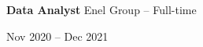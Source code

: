 \documentclass[10pt, letterpaper]{article}
\newenvironment{highlights}{
    \begin{itemize}[
        topsep=0.10 cm,
        parsep=0.10 cm,
        partopsep=0pt,
        itemsep=0pt,
        leftmargin=0 cm + 10pt
    ]
}{
    \end{itemize}
} %
\newenvironment{twocolentry}[2][]{
    \onecolentry
    \def\secondColumn{#2}
    \setcolumnwidth{\fill, 4.5 cm}
    \begin{paracol}{2}
}{
    \switchcolumn \raggedleft \secondColumn
    \end{paracol}
    \endonecolentry
} %
\begin{document}
\begin{twocolentry}{Nov 2020 – Dec 2021}
    \textbf{Data Analyst} \textbar Enel Group – Full-time
\end{twocolentry}













\end{document}
